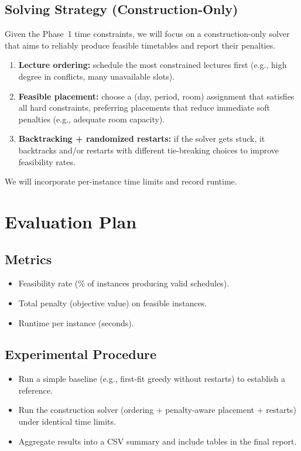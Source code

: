\documentclass[11pt,letterpaper]{article}
\begin{document}
\subsection{Solving Strategy (Construction-Only)}
Given the Phase~1 time constraints, we will focus on a construction-only solver that aims to reliably produce feasible timetables and report their penalties.
\begin{enumerate}[nosep]
  \item \textbf{Lecture ordering:} schedule the most constrained lectures first (e.g., high degree in conflicts, many unavailable slots).
  \item \textbf{Feasible placement:} choose a (day, period, room) assignment that satisfies all hard constraints, preferring placements that reduce immediate soft penalties (e.g., adequate room capacity).
  \item \textbf{Backtracking + randomized restarts:} if the solver gets stuck, it backtracks and/or restarts with different tie-breaking choices to improve feasibility rates.
\end{enumerate}
We will incorporate per-instance time limits and record runtime.

\section{Evaluation Plan}
\subsection{Metrics}
\begin{itemize}[nosep]
  \item Feasibility rate (\% of instances producing valid schedules).
  \item Total penalty (objective value) on feasible instances.
  \item Runtime per instance (seconds).
\end{itemize}

\subsection{Experimental Procedure}
\begin{itemize}[nosep]
  \item Run a simple baseline (e.g., first-fit greedy without restarts) to establish a reference.
  \item Run the construction solver (ordering + penalty-aware placement + restarts) under identical time limits.
  \item Aggregate results into a CSV summary and include tables in the final report.
\end{itemize}
\end{document}
